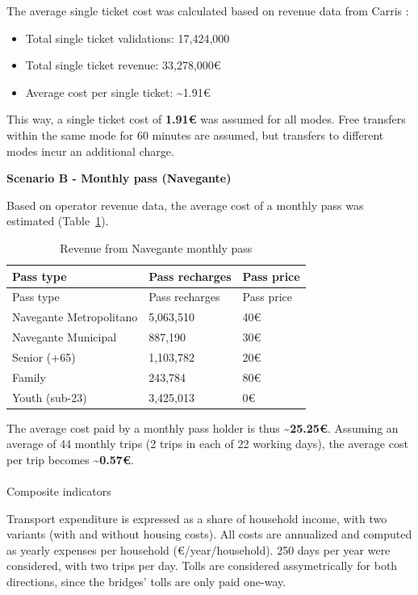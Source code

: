 \documentclass[
  authoryear,
  review,
  1p]{elsarticle}
\makeatletter
\let\oldparagraph\paragraph
\renewcommand{\paragraph}{
    \@ifstar
      \xxxParagraphStar
      \xxxParagraphNoStar
  }
\newcommand{\xxxParagraphStar}[1]{\oldparagraph*{#1}\mbox{}}
\newcommand{\xxxParagraphNoStar}[1]{\oldparagraph{#1}\mbox{}}
\makeatother
\begin{document}
The average single ticket cost was calculated based on revenue data from
Carris \citep{carris_contas_2024}:

\begin{itemize}
\item
  Total single ticket validations: 17,424,000
\item
  Total single ticket revenue: 33,278,000€
\item
  Average cost per single ticket: \textasciitilde1.91€
\end{itemize}

This way, a single ticket cost of \textbf{1.91€} was assumed for all
modes. Free transfers within the same mode for 60 minutes are assumed,
but transfers to different modes incur an additional charge.

\textbf{Scenario B - Monthly pass (Navegante)}

Based on operator revenue data, the average cost of a monthly pass was
estimated (Table~\ref{tbl-navegante}).

\begin{longtable}[]{@{}lll@{}}
\caption{Revenue from Navegante monthly
pass}\label{tbl-navegante}\tabularnewline
\toprule\noalign{}
Pass type & Pass recharges & Pass price \\
\midrule\noalign{}
\endfirsthead
\toprule\noalign{}
Pass type & Pass recharges & Pass price \\
\midrule\noalign{}
\endhead
\bottomrule\noalign{}
\endlastfoot
Navegante Metropolitano & 5,063,510 & 40€ \\
Navegante Municipal & 887,190 & 30€ \\
Senior (+65) & 1,103,782 & 20€ \\
Family & 243,784 & 80€ \\
Youth (sub-23) & 3,425,013 & 0€ \\
\end{longtable}

The average cost paid by a monthly pass holder is thus
\textbf{\textasciitilde25.25€}. Assuming an average of 44 monthly trips
(2 trips in each of 22 working days), the average cost per trip becomes
\textbf{\textasciitilde0.57€}.

\paragraph{Composite indicators}\label{sec-MET_aff_composite}

Transport expenditure is expressed as a share of household income, with
two variants (with and without housing costs). All costs are annualized
and computed as yearly expenses per household (€/year/household). 250
days per year were considered, with two trips per day. Tolls are
considered assymetrically for both directions, since the bridges' tolls
are only paid one-way.
\end{document}
